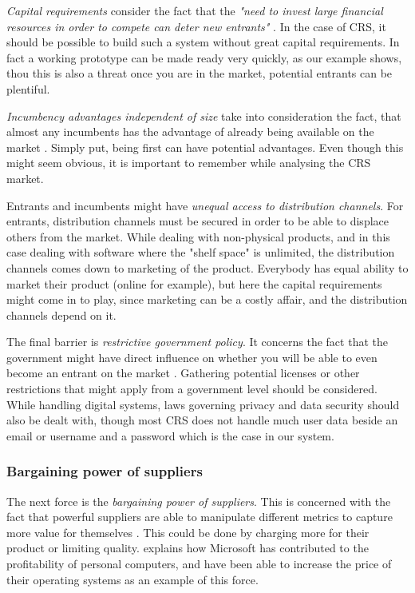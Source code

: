 \emph{Capital requirements} consider the fact that the \emph{"need to invest large financial resources in order to compete can deter new entrants"} \cite[p.~81]{porter2008five}. In the case of CRS, it should be possible to build such a system without great capital requirements. In fact a working prototype can be made ready very quickly, as our example shows, thou this is also a threat once you are in the market, potential entrants can be plentiful.

\emph{Incumbency advantages independent of size} take into consideration the fact, that almost any incumbents has the advantage of already being available on the market \cite[p.~81]{porter2008five}. Simply put, being first can have potential advantages. Even though this might seem obvious, it is important to remember while analysing the CRS market. 

Entrants and incumbents might have \emph{unequal access to distribution channels}. For entrants, distribution channels must be secured in order to be able to displace others from the market. While dealing with non-physical products, and in this case dealing with software where the "shelf space" is unlimited, the distribution channels comes down to marketing of the product. Everybody has equal ability to market their product (online for example), but here the capital requirements might come in to play, since marketing can be a costly affair, and the distribution channels depend on it.

The final barrier is \emph{restrictive government policy}. It concerns the fact that the government might have direct influence on whether you will be able to even become an entrant on the market \cite[p.~82]{porter2008five}. Gathering potential licenses or other restrictions that might apply from a government level should be considered. While handling digital systems, laws governing privacy and data security should also be dealt with, though most CRS does not handle much user data beside an email or username and a password which is the case in our system.

\subsubsection*{Bargaining power of suppliers}
The next force is the \emph{bargaining power of suppliers}. This is concerned with the fact that powerful suppliers are able to manipulate different metrics to capture more value for themselves \cite[p.~82]{porter2008five}. This could be done by charging more for their product or limiting quality.  explains how Microsoft has contributed to the profitability of personal computers, and have been able to increase the price of their operating systems as an example of this force.

